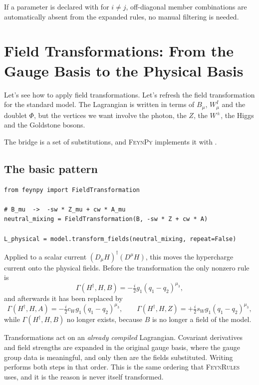 \begin{tcolorbox}[warnbox, title={Off-diagonal zeroes}]
If a parameter is declared with  for
$i \neq j$, off-diagonal member combinations are automatically absent
from the expanded rules, no manual filtering is needed.
\end{tcolorbox}

\section{Field Transformations: From the Gauge Basis to the Physical Basis}
\label{sec:feynpy-transformations}

Let's see how to apply field transformations. Let's refresh the field transformation for the standard model. The Lagrangian is written in terms of $B_\mu$, $W^I_\mu$ and the doublet $\Phi$, but the vertices we want involve the photon, the $Z$, the $W^\pm$, the Higgs and the Goldstone bosons.


The bridge is a set of substitutions, and \textsc{FeynPy} implements it with .

\subsection*{The basic pattern}

\begin{verbatim}
from feynpy import FieldTransformation

# B_mu  ->  -sw * Z_mu + cw * A_mu
neutral_mixing = FieldTransformation(B, -sw * Z + cw * A)

L_physical = model.transform_fields(neutral_mixing, repeat=False)
\end{verbatim}

\noindent Applied to a scalar current $ (D_\mu H)^\dagger (D^\mu H)$, this
moves the hypercharge current onto the physical fields. Before the
transformation the only nonzero rule is
\[
    \Gamma(H^\dagger, H, B) =
      -\tfrac{i}{2} g_1 (q_1 - q_2)^{\mu_3},
\]
and afterwards it has been replaced by
\[
    \Gamma(H^\dagger, H, A) = -\tfrac{i}{2} c_W g_1 (q_1 - q_2)^{\mu_3},
    \qquad
    \Gamma(H^\dagger, H, Z) = +\tfrac{i}{2} s_W g_1 (q_1 - q_2)^{\mu_3},
\]
while $\Gamma(H^\dagger, H, B)$ no longer exists, because $B$ is no longer a
field of the model.

\begin{tcolorbox}[infobox, title={Compile first, transform second}]
Transformations act on an \emph{already compiled} Lagrangian. Covariant
derivatives and field strengths are expanded in the original gauge basis,
where the gauge group data is meaningful, and only then are the fields
substituted. Writing  performs both steps in
that order. This is the same ordering that \textsc{FeynRules} uses, and it is
the reason  is never itself transformed.
\end{tcolorbox}

